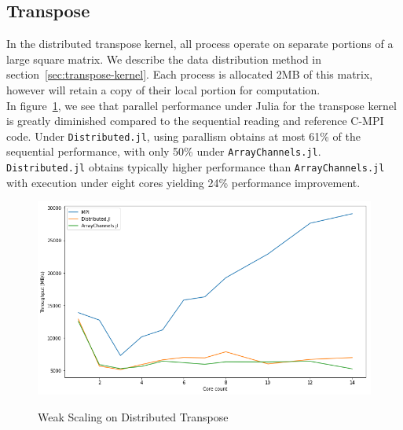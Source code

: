 \subsection{Transpose}
\label{sec:transpose-results}

In the distributed transpose kernel, all process operate on separate
portions of a large square matrix. We describe the data distribution
method in section~\ref{sec:transpose-kernel}. Each process is allocated
2MB of this matrix, however will retain a copy of their local portion
for computation.\\

In figure~\ref{fig:transpose-results}, we see that parallel performance
under Julia for the transpose kernel is greatly diminished compared to
the sequential reading and reference C-MPI code. Under
\texttt{Distributed.jl}, using parallism obtains at most 61\% of the
sequential performance, with only 50\% under \texttt{ArrayChannels.jl}.
\texttt{Distributed.jl} obtains typically higher performance than
\texttt{ArrayChannels.jl} with execution under eight cores yielding 24\%
performance improvement.\\

\begin{figure}[htb]
  \includegraphics[width=\linewidth]{figs/transpose.png}
  \label{fig:transpose-results}
  \caption{Weak Scaling on Distributed Transpose}
\end{figure}

